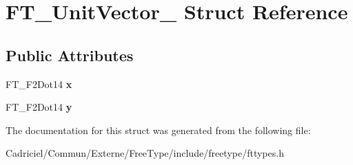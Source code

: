 \hypertarget{struct_f_t___unit_vector__}{}\section{F\+T\+\_\+\+Unit\+Vector\+\_\+ Struct Reference}
\label{struct_f_t___unit_vector__}
\subsection*{Public Attributes}
\begin{DoxyCompactItemize}
\item 
F\+T\+\_\+\+F2\+Dot14 {\bfseries x}\hypertarget{struct_f_t___unit_vector___a03c9f8ae35a5ad1bcac49995a9dac714}{}\label{struct_f_t___unit_vector___a03c9f8ae35a5ad1bcac49995a9dac714}

\item 
F\+T\+\_\+\+F2\+Dot14 {\bfseries y}\hypertarget{struct_f_t___unit_vector___a12eb9ad5c47614f5f2d3f9e401933d0e}{}\label{struct_f_t___unit_vector___a12eb9ad5c47614f5f2d3f9e401933d0e}

\end{DoxyCompactItemize}


The documentation for this struct was generated from the following file\+:\begin{DoxyCompactItemize}
\item 
Cadriciel/\+Commun/\+Externe/\+Free\+Type/include/freetype/fttypes.\+h\end{DoxyCompactItemize}
